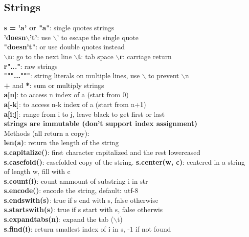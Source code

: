 \documentclass{cheatsheet}
\begin{document}
    \subsection{Strings}
    \textbf{s = 'a' or "a"}: single quotes strings \\
    \textbf{'doesn$\backslash$'t'}: use $\backslash$' to escape the single quote \\
    \textbf{"doesn't"}: or use double quotes instead \\
    \textbf{$\backslash$n}: go to the next line \hspace{0.3cm} \textbf{$\backslash$t}: tab space \hspace{0.3cm} \textbf{$\backslash$r}: carriage return \\
    \textbf{r"..."}: raw strings \\
    \textbf{"""..."""}: string literals on multiple lines, use $\backslash$ to prevent $\backslash$n \\
    \textbf{+} and \textbf{*}: sum or multiply strings \\
    \textbf{a[n]}: to access n index of a (start from 0) \\
    \textbf{a[-k]}: to access n-k index of a (start from n+1) \\
    \textbf{a[i:j]}: range from i to j, leave black to get first or last \\
    \textbf{strings are immutable (don't support index assignment)} \\
    Methods (all return a copy): \\
    \textbf{len(a)}: return the length of the string \\
    \textbf{s.capitalize()}: first character capitalized and the rest lowercased \\
    \textbf{s.casefold()}: casefolded copy of the string.
    \textbf{s.center(w, c)}: centered in a string of length w, fill with c \\
    \textbf{s.count(i)}: count ammount of substring i in str \\
    \textbf{s.encode()}: encode the string, default: utf-8 \\
    \textbf{s.endswith(s)}: true if s end with s, false otherwise \\
    \textbf{s.startswith(s)}: true if s start with s, false otherwis \\
    \textbf{s.expandtabs(n)}: expand the tab ($\backslash$t) \\
    \textbf{s.find(i)}: return smallest index of i in s, -1 if not found \\
\end{document}
